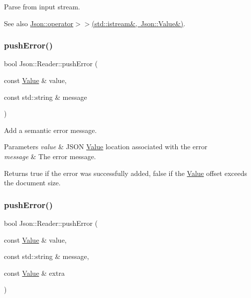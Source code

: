 Parse from input stream. 

\begin{DoxySeeAlso}{See also}
\mbox{\hyperlink{namespace_json_a1b4aef303177bbd4d18acc87858e0ec2}{Json\+::operator$>$$>$(std\+::istream\&, Json\+::\+Value\&)}}. 
\end{DoxySeeAlso}
\mbox{\label{class_json_1_1_reader_ade6c28e0ef00d8f2e0aa2283f91c3e37}} 
\subsubsection{\texorpdfstring{pushError()}{pushError()}\hspace{0.1cm}{\footnotesize\ttfamily [1/2]}}
{\footnotesize\ttfamily bool Json\+::\+Reader\+::push\+Error (\begin{DoxyParamCaption}\item[{const \mbox{\hyperlink{class_json_1_1_value}{Value}} \&}]{value,  }\item[{const std\+::string \&}]{message }\end{DoxyParamCaption})}



Add a semantic error message. 


\begin{DoxyParams}{Parameters}
{\em value} & J\+S\+ON \mbox{\hyperlink{class_json_1_1_value}{Value}} location associated with the error \\
\hline
{\em message} & The error message. \\
\hline
\end{DoxyParams}
\begin{DoxyReturn}{Returns}
{\ttfamily true} if the error was successfully added, {\ttfamily false} if the \mbox{\hyperlink{class_json_1_1_value}{Value}} offset exceeds the document size. 
\end{DoxyReturn}
\mbox{\label{class_json_1_1_reader_a9b474233c3a7c688e340e70665d45223}} 
\subsubsection{\texorpdfstring{pushError()}{pushError()}\hspace{0.1cm}{\footnotesize\ttfamily [2/2]}}
{\footnotesize\ttfamily bool Json\+::\+Reader\+::push\+Error (\begin{DoxyParamCaption}\item[{const \mbox{\hyperlink{class_json_1_1_value}{Value}} \&}]{value,  }\item[{const std\+::string \&}]{message,  }\item[{const \mbox{\hyperlink{class_json_1_1_value}{Value}} \&}]{extra }\end{DoxyParamCaption})}



